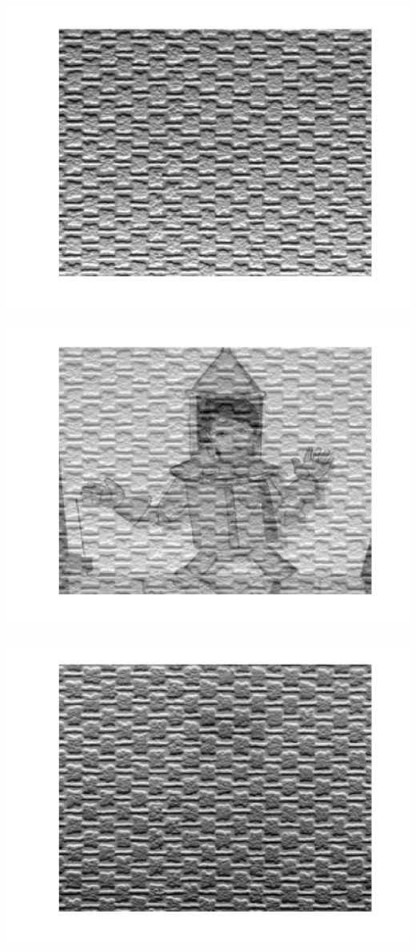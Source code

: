 \begin{center}
\begin{minipage}{0.33\linewidth}
\end{minipage}%
\hfill
\begin{minipage}{0.33\linewidth}
\includegraphics[width=0.9\linewidth]{images/source2.png}
\end{minipage}%
\hfill
\begin{minipage}{0.33\linewidth}
\includegraphics[width=0.9\linewidth]{images/mixed2.png}
\end{minipage}
\hfill
\begin{minipage}{0.33\linewidth}
\includegraphics[width=0.9\linewidth]{images/separated2.png}

\end{minipage}
\end{center}
